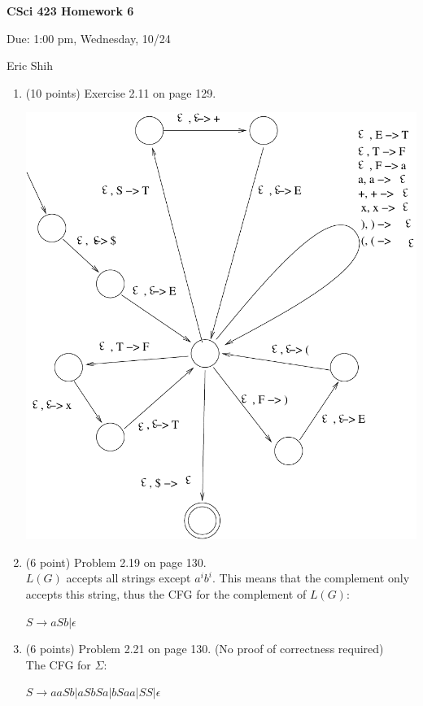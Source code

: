 \documentclass[11pt]{article}
\begin{document}
\begin{LARGE}
\centerline {\bf CSci 423 Homework 6}
\end{LARGE}
\vskip 0.25cm

\centerline{Due: 1:00 pm, Wednesday, 10/24}
\centerline{Eric Shih}

\begin{enumerate}
  \item (10 points) Exercise 2.11 on page 129. \\
    \begin{center}
      \includegraphics[scale=.7] {fig1.pdf}
    \end{center}
  \item (6 point) Problem 2.19 on page 130. \\
    $L(G)$ accepts all strings except $a^ib^i$. This means that the complement
    only accepts this string, thus the CFG for the complement of $L(G)$:
    \begin{center}
     $S \to aSb | \epsilon $
    \end{center}
  
  \item (6 points) Problem 2.21 on page 130. (No proof of correctness required) \\
    The CFG for $\Sigma$:
      \begin{center}
       $S \to aaSb | aSbSa | bSaa | SS | \epsilon $
      \end{center}


\end{enumerate}
\end{document}
